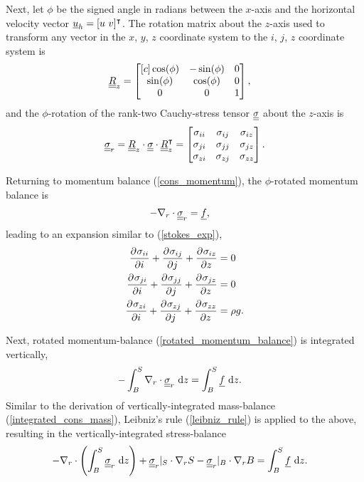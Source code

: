 Next, let $\phi$ be the signed angle in radians between the $x$-axis and the horizontal velocity vector $\underline{u}_h = [u\ v]^\intercal$.  The rotation matrix about the $z$-axis used to transform any vector in the $x$, $y$, $z$ coordinate system to the $i$, $j$, $z$ coordinate system is
\begin{align*}
  \underline{\underline{R}}_z &= \begin{bmatrix}[c]
                     \cos(\phi)  & -\sin(\phi) & 0 \\
                     \sin(\phi)  &  \cos(\phi) & 0 \\
                     0           &  0          & 1
                   \end{bmatrix},
\end{align*}
and the $\phi$-rotation of the rank-two Cauchy-stress tensor $\underline{\underline{\sigma}}$ about the $z$-axis is
\begin{align}
  \label{rotated_stress_tensor}
  \underline{\underline{\sigma}}_r = \underline{\underline{R}}_z \cdot \underline{\underline{\sigma}} \cdot \underline{\underline{R}}_z^\intercal
                     = \begin{bmatrix}
                         \sigma_{ii} & \sigma_{ij} & \sigma_{iz} \\
                         \sigma_{ji} & \sigma_{jj} & \sigma_{jz} \\
                         \sigma_{zi} & \sigma_{zj} & \sigma_{zz}
                       \end{bmatrix}.
\end{align}

Returning to momentum balance (\ref{cons_momentum}), the $\phi$-rotated momentum balance is
\begin{align}
  \label{rotated_momentum_balance}
  - \nabla_r \cdot \underline{\underline{\sigma}}_r &= \underline{f},
\end{align}
leading to an expansion similar to (\ref{stokes_exp}),
\begin{align*}
  \frac{\partial^{} \sigma_{ii}}{\partial i^{} } + \frac{\partial^{} \sigma_{ij}}{\partial j^{} } + \frac{\partial^{} \sigma_{iz}}{\partial z^{} } &= 0 \\ 
  \frac{\partial^{} \sigma_{ji}}{\partial i^{} } + \frac{\partial^{} \sigma_{jj}}{\partial j^{} } + \frac{\partial^{} \sigma_{jz}}{\partial z^{} } &= 0 \\ 
  \frac{\partial^{} \sigma_{zi}}{\partial i^{} } + \frac{\partial^{} \sigma_{zj}}{\partial j^{} } + \frac{\partial^{} \sigma_{zz}}{\partial z^{} } &= \rho g.
\end{align*}

Next, rotated momentum-balance (\ref{rotated_momentum_balance}) is integrated vertically, 
\begin{align}
  \label{vertically_integrated_stress_balance_one}
  - \int_B^S \nabla_r \cdot \underline{\underline{\sigma}}_r \ \mathrm{d}z &= \int_B^S \underline{f} \ \mathrm{d}z.
\end{align}
Similar to the derivation of vertically-integrated mass-balance (\ref{integrated_cons_mass}), Leibniz's rule (\ref{leibniz_rule})  is applied to the above, resulting in the vertically-integrated stress-balance
\begin{align}
  \label{vertically_integrated_stress_balance}
  - \nabla_r \cdot \left( \int_B^S \underline{\underline{\sigma}}_r \ \mathrm{d}z \right) + \underline{\underline{\sigma}}_r |_S \cdot \nabla_r S - \underline{\underline{\sigma}}_r |_B \cdot \nabla_r B &= \int_B^S \underline{f} \ \mathrm{d}z.
\end{align}

